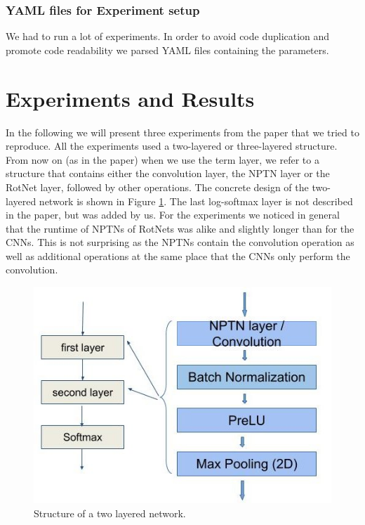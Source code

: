 \documentclass{llncs}
\begin{document}
\subsubsection{YAML files for Experiment setup}
We had to run a lot of experiments. In order to avoid code duplication and promote code readability we parsed YAML files containing the parameters.

\section{Experiments and Results}	
In the following we will present three experiments from the paper that we tried to reproduce. 
All the experiments used a two-layered or three-layered structure. From now on (as in the paper) when we use the term layer, we refer to a structure that contains either the convolution layer, the NPTN layer or the RotNet layer, followed by other operations. The concrete design of the two-layered network is shown in Figure \ref{pic:network_structure}. The last log-softmax layer is not described in the paper, but was added by us. 
For the experiments we noticed in general that the runtime of NPTNs of RotNets was alike and slightly longer than for the CNNs. This is not surprising as the NPTNs contain the convolution operation as well as additional operations at the same place that the CNNs only perform the convolution. 
\begin{figure}
	\begin{center}
	\includegraphics[scale=0.35]{result_images/network_structure.jpg}
	\caption{Structure of a two layered network.}
	\label{pic:network_structure}
	\end{center}
\end{figure}
\end{document}
